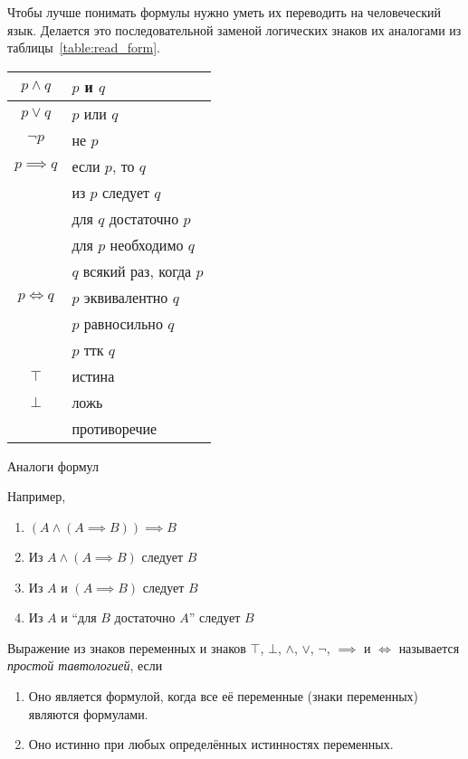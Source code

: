 Чтобы лучше понимать формулы нужно уметь их переводить на человеческий язык. Делается
это последовательной заменой логических знаков
их аналогами из таблицы~\ref{table:read_form}.
\begin{margintable}
	\begin{tabular}{cl}
		$p\land q$    & $p$ и $q$                                   \\\hline
		$p\lor q$     & $p$ или $q$                                 \\\hline
		$\lnot p$     & не $p$                                      \\\hline
		$p\implies q$ & если $p$, то $q$                            \\
		              & из $p$ следует $q$                          \\
		              & для $q$ достаточно\index{достаточность} $p$ \\
		              & для $p$ необходимо\index{необходимость} $q$ \\
		              & $q$ всякий раз, когда $p$                   \\\hline
		$p\iff q$     & $p$ эквивалентно $q$                        \\
		              & $p$ равносильно $q$                         \\
		              & $p$ ттк $q$                                 \\\hline
		$\top$        & истина                                      \\\hline
		$\bot$        & ложь                                        \\
		              & противоречие
	\end{tabular}
	\caption{Аналоги формул}\label{table:read_form}
\end{margintable}

Например,
\begin{enumerate}
	\item{}$(A\land (A\implies B))\implies B$
	\item{}Из $A\land (A\implies B)$ следует $B$
	\item{}Из $A$ и $(A\implies B)$ следует $B$
	\item{}Из $A$ и ``для $B$ достаточно $A$'' следует $B$
\end{enumerate}

\pagebreak

Выражение из знаков переменных и знаков $\top$, $\bot$, $\land$, $\lor$, $\lnot$,
$\implies$ и $\iff$ называется
{\it простой тавтологией}, если
\begin{multicols}{2}
	\begin{enumerate}
		\item{}Оно является формулой, когда все её переменные (знаки переменных)
		являются формулами.
		\columnbreak
		\item{}Оно истинно при любых определённых истинностях переменных.
	\end{enumerate}
\end{multicols}

